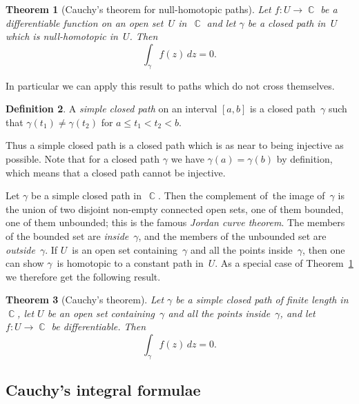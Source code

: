 \documentclass{amsproc}
\newtheorem{theorem}{Theorem}[subsection]
\theoremstyle{definition}
\newtheorem{definition}[theorem]{Definition}
\theoremstyle{remark}
\DeclareMathOperator{\C}{\mathbb{C}}
\numberwithin{equation}{section}
\begin{document}
\begin{theorem}[Cauchy's theorem for null-homotopic paths] \label{CMT7.4}
Let $ f: U \to \C $ be a differentiable function on an open set~$ U $ in~$ \C $ and let $ \gamma $ be a closed path in~$ U $ which is null-homotopic in~$ U $. Then
$$
\int_\gamma f(z)\,dz = 0.
$$
\end{theorem}

In particular we can apply this result to paths which do not cross themselves.

\begin{definition} \label{CMD7.5}
A \emph{simple closed path} on an interval $ [a,b] $ is a closed path~$ \gamma $ such that $ \gamma(t_1) \neq \gamma(t_2) $ for $ a \leq t_1 < t_2 < b $.
\end{definition}

Thus a simple closed path is a closed path which is as near to being injective as possible. Note that for a closed path $ \gamma $ we have $ \gamma(a) = \gamma(b) $ by definition,
which means that a closed path cannot be injective.

Let $ \gamma $ be a simple closed path in~$ \C $. Then the complement of~the image of~$ \gamma $ is the union of
two disjoint non-empty connected open sets, one of them bounded, one of them unbounded; this is the famous \emph{Jordan curve theorem}. The members of the bounded set
are \emph{inside}~$ \gamma $, and the members of the unbounded set are \emph{outside}~$ \gamma $. If $ U $~is an open set containing~$ \gamma $ and all the points
inside~$ \gamma $, then one can show $ \gamma $~is homotopic to a constant path in~$ U $. As a special case of Theorem~\ref{CMT7.4} we therefore get the following result.

\begin{theorem}[Cauchy's theorem] \label{CMT7.6}
Let $ \gamma $ be a simple closed path of finite length in~$ \C $, let $ U $ be an open set containing~$ \gamma $ and all the points inside~$ \gamma $, and let $ f: U \to \C $ be differentiable. Then
$$
\int_\gamma f(z)\,dz = 0.
$$
\end{theorem}


\vfill\pagebreak


\subsection{Cauchy's integral formulae} \label{CMS8}
\end{document}
